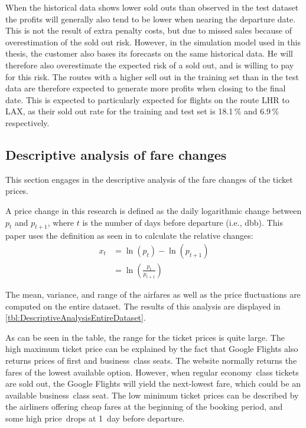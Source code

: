 When the historical data shows lower sold outs than observed in the test dataset the profits will generally also tend to be lower when nearing the departure date. This is not the result of extra penalty costs, but due to missed sales because of overestimation of the sold out risk. However, in the simulation model used in this thesis, the customer also bases its forecasts on the same historical data. He will therefore also overestimate the expected risk of a sold out, and is willing to pay for this risk. The routes with a higher sell out in the training set than in the test data are therefore expected to generate more profits when closing to the final date. This is expected to particularly expected for flights on the route LHR to LAX, as their sold out rate for the training and test set is 18.1\,\% and 6.9\,\% respectively.


\subsection{Descriptive analysis of fare changes}
\label{subsec:DescriptiveAnalysisOfFareChanges}
This section engages in the descriptive analysis of the fare changes of the ticket prices.

A price change in this research is defined as the daily logarithmic change between $p_t$ and $p_{t+1}$, where $t$ is the number of days before departure (i.e., dbb). This paper uses the definition as seen in  to calculate the relative changes:
\begin{equation*}
    \begin{split}
    x_t &= \ln(p_{t}) - \ln({p_{t+1}}) \\
    &= \ln\left( \frac{p_{t}}{p_{t+1}}\right) 
    \end{split}
\end{equation*}


The mean, variance, and range of the airfares as well as the price fluctuations are computed on the entire dataset. The results of this analysis are displayed in \autoref{tbl:DescriptiveAnalysisEntireDataset}.

As can be seen in the table, the range for the ticket prices is quite large. The high maximum ticket price can be explained by the fact that Google Flights also returns prices of first and business~class seats. The website normally returns the fares of the lowest available option. However, when regular economy~class tickets are sold out, the Google Flights will yield the next-lowest fare, which could be an available business~class seat. The low minimum ticket prices can be described by the airliners offering cheap fares at the beginning of the booking period, and some high price~drops at 1~day before departure.

